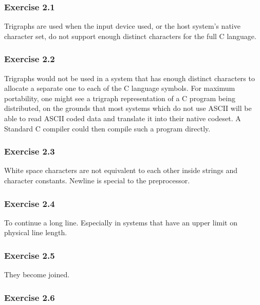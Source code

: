   

  \subsubsection*{Exercise 2.1}

   Trigraphs are used when the input device used, or the host system's
    native character set, do not support enough distinct characters for the
    full C language.


  

  \subsubsection*{Exercise 2.2}

   Trigraphs would not be used in a system that has enough distinct
    characters to allocate a separate one to each of the C language symbols.
    For maximum portability, one might see a trigraph representation of
    a C program being distributed, on the grounds that most systems which do
    not use ASCII will be able to read ASCII coded data and translate it into
    their native codeset.  A Standard C compiler could then compile such
    a program directly.


  

  \subsubsection*{Exercise 2.3}

   White space characters are not equivalent to each other inside strings
    and character constants. Newline is special to the preprocessor.


  

  \subsubsection*{Exercise 2.4}

   To continue a long line. Especially in systems that have an upper limit
    on physical line length.


  

  \subsubsection*{Exercise 2.5}

   They become joined.


  

  \subsubsection*{Exercise 2.6}

